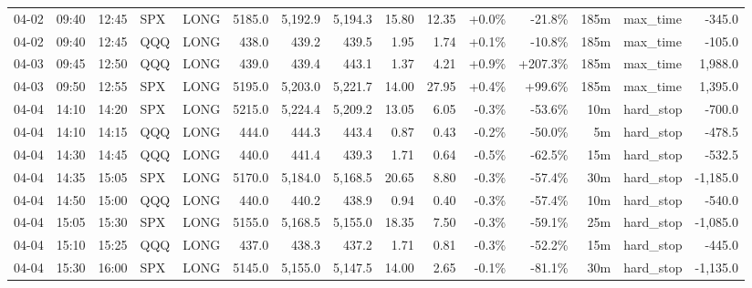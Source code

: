 \documentclass[11pt,a4paper,twoside]{article}
\begin{document}
\begin{landscape}
\begin{center}
\begin{longtable}{>{\color{txtmain}}l l l l l r r r r r r r r >{\color{txtmain}}l r}
04-02 & 09:40 & 12:45 & SPX & LONG & 5185.0 & 5,192.9 & 5,194.3 & 15.80 & 12.35 & \textcolor{wingreen}{+0.0\%} & \textcolor{lossred}{-21.8\%} & 185m & max\_time & \textcolor{lossred}{-345.0} \\
04-02 & 09:40 & 12:45 & QQQ & LONG & 438.0 & 439.2 & 439.5 & 1.95 & 1.74 & \textcolor{wingreen}{+0.1\%} & \textcolor{lossred}{-10.8\%} & 185m & max\_time & \textcolor{lossred}{-105.0} \\
04-03 & 09:45 & 12:50 & QQQ & LONG & 439.0 & 439.4 & 443.1 & 1.37 & 4.21 & \textcolor{wingreen}{+0.9\%} & \textcolor{wingreen}{+207.3\%} & 185m & max\_time & \textcolor{wingreen}{1,988.0} \\
04-03 & 09:50 & 12:55 & SPX & LONG & 5195.0 & 5,203.0 & 5,221.7 & 14.00 & 27.95 & \textcolor{wingreen}{+0.4\%} & \textcolor{wingreen}{+99.6\%} & 185m & max\_time & \textcolor{wingreen}{1,395.0} \\
04-04 & 14:10 & 14:20 & SPX & LONG & 5215.0 & 5,224.4 & 5,209.2 & 13.05 & 6.05 & \textcolor{lossred}{-0.3\%} & \textcolor{lossred}{-53.6\%} & 10m & hard\_stop & \textcolor{lossred}{-700.0} \\
04-04 & 14:10 & 14:15 & QQQ & LONG & 444.0 & 444.3 & 443.4 & 0.87 & 0.43 & \textcolor{lossred}{-0.2\%} & \textcolor{lossred}{-50.0\%} & 5m & hard\_stop & \textcolor{lossred}{-478.5} \\
04-04 & 14:30 & 14:45 & QQQ & LONG & 440.0 & 441.4 & 439.3 & 1.71 & 0.64 & \textcolor{lossred}{-0.5\%} & \textcolor{lossred}{-62.5\%} & 15m & hard\_stop & \textcolor{lossred}{-532.5} \\
04-04 & 14:35 & 15:05 & SPX & LONG & 5170.0 & 5,184.0 & 5,168.5 & 20.65 & 8.80 & \textcolor{lossred}{-0.3\%} & \textcolor{lossred}{-57.4\%} & 30m & hard\_stop & \textcolor{lossred}{-1,185.0} \\
04-04 & 14:50 & 15:00 & QQQ & LONG & 440.0 & 440.2 & 438.9 & 0.94 & 0.40 & \textcolor{lossred}{-0.3\%} & \textcolor{lossred}{-57.4\%} & 10m & hard\_stop & \textcolor{lossred}{-540.0} \\
04-04 & 15:05 & 15:30 & SPX & LONG & 5155.0 & 5,168.5 & 5,155.0 & 18.35 & 7.50 & \textcolor{lossred}{-0.3\%} & \textcolor{lossred}{-59.1\%} & 25m & hard\_stop & \textcolor{lossred}{-1,085.0} \\
04-04 & 15:10 & 15:25 & QQQ & LONG & 437.0 & 438.3 & 437.2 & 1.71 & 0.81 & \textcolor{lossred}{-0.3\%} & \textcolor{lossred}{-52.2\%} & 15m & hard\_stop & \textcolor{lossred}{-445.0} \\
04-04 & 15:30 & 16:00 & SPX & LONG & 5145.0 & 5,155.0 & 5,147.5 & 14.00 & 2.65 & \textcolor{lossred}{-0.1\%} & \textcolor{lossred}{-81.1\%} & 30m & hard\_stop & \textcolor{lossred}{-1,135.0} \\

\end{longtable}
\end{center}
\end{landscape}
\end{document}
